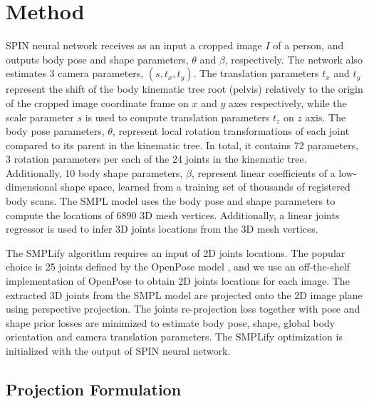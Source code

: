 \documentclass[runningheads]{llncs}
\begin{document}
\section{Method}

SPIN neural network receives as an input a cropped image $ I $ of a person, and outputs body pose and shape parameters, $ \theta $ and $ \beta $, respectively.
The network also estimates 3 camera parameters, $ (s, t_x, t_y) $. The translation parameters $ t_x$ and  $t_y$ represent the shift of the body kinematic tree root (pelvis) relatively to the origin of the cropped image coordinate frame on $ x $ and $ y $ axes respectively, while the scale parameter $ s $ is used to compute translation parameters $ t_z$  on $ z $ axis. 
The body pose parameters, $ \theta $, represent local rotation transformations of each joint compared to its parent in the kinematic tree. In total, it contains 72 parameters, 3 rotation parameters per each of the 24 joints in the kinematic tree. Additionally, 10 body shape parameters, $ \beta $, represent linear coefficients of a low-dimensional shape space, learned from a training set of thousands of registered body scans. The SMPL model uses the body pose and shape parameters to compute the locations of 6890 3D mesh vertices. Additionally, a linear joints regressor is used to infer 3D joints locations from the 3D mesh vertices.

The SMPLify algorithm requires an input of 2D joints locations. The popular choice is 25 joints defined by the OpenPose model \cite{cao2017realtime}, and we use an off-the-shelf implementation of OpenPose to obtain 2D joints locations for each image. 
The extracted 3D joints from the SMPL model are projected onto the 2D image plane using perspective projection. The joints re-projection loss together with pose and shape prior losses are minimized to estimate body pose, shape, global body orientation and camera translation parameters. The SMPLify optimization is initialized with the output of SPIN neural network.

\subsection{Projection Formulation}
\label{sec:projection_formulation}
\end{document}
